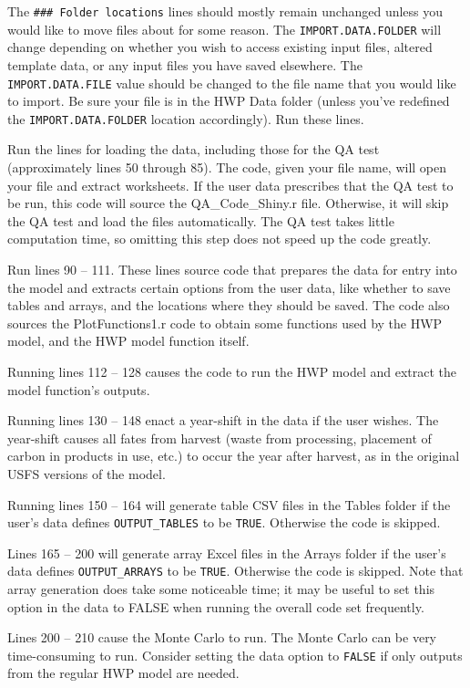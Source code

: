 \documentclass[
  openany]{book}
\begin{document}
The \texttt{\#\#\#\ Folder\ locations} lines should mostly remain
unchanged unless you would like to move files about for some reason. The
\texttt{IMPORT.DATA.FOLDER} will change depending on whether you wish to
access existing input files, altered template data, or any input files
you have saved elsewhere. The \texttt{IMPORT.DATA.FILE} value should be
changed to the file name that you would like to import. Be sure your
file is in the HWP Data folder (unless you've redefined the
\texttt{IMPORT.DATA.FOLDER} location accordingly). Run these lines.

Run the lines for loading the data, including those for the QA test
(approximately lines 50 through 85). The code, given your file name,
will open your file and extract worksheets. If the user data prescribes
that the QA test to be run, this code will source the QA\_Code\_Shiny.r
file. Otherwise, it will skip the QA test and load the files
automatically. The QA test takes little computation time, so omitting
this step does not speed up the code greatly.

Run lines 90 -- 111. These lines source code that prepares the data for
entry into the model and extracts certain options from the user data,
like whether to save tables and arrays, and the locations where they
should be saved. The code also sources the PlotFunctions1.r code to
obtain some functions used by the HWP model, and the HWP model function
itself.

Running lines 112 -- 128 causes the code to run the HWP model and
extract the model function's outputs.

Running lines 130 -- 148 enact a year-shift in the data if the user
wishes. The year-shift causes all fates from harvest (waste from
processing, placement of carbon in products in use, etc.) to occur the
year after harvest, as in the original USFS versions of the model.

Running lines 150 -- 164 will generate table CSV files in the Tables
folder if the user's data defines \texttt{OUTPUT\_TABLES} to be
\texttt{TRUE}. Otherwise the code is skipped.

Lines 165 -- 200 will generate array Excel files in the Arrays folder if
the user's data defines \texttt{OUTPUT\_ARRAYS} to be \texttt{TRUE}.
Otherwise the code is skipped. Note that array generation does take some
noticeable time; it may be useful to set this option in the data to
FALSE when running the overall code set frequently.

Lines 200 -- 210 cause the Monte Carlo to run. The Monte Carlo can be
very time-consuming to run. Consider setting the data option to
\texttt{FALSE} if only outputs from the regular HWP model are needed.
\end{document}
